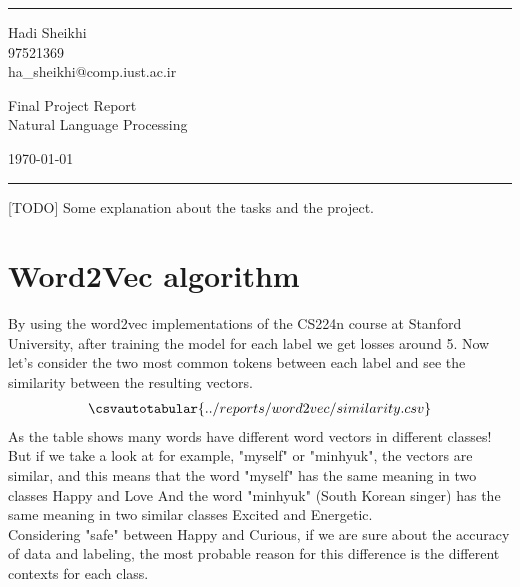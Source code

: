 \documentclass[a4paper]{article}
\begin{document}

\fancyhead[C]{}
\hrule \medskip %
\begin{minipage}{0.295\textwidth} 
\raggedright
\footnotesize
Hadi Sheikhi \hfill\\   
97521369\hfill\\
ha\_sheikhi@comp.iust.ac.ir
\end{minipage}
\begin{minipage}{0.4\textwidth} 
\centering 
\large 
Final Project Report\\ 
\normalsize 
Natural Language Processing\\ 
\end{minipage}
\begin{minipage}{0.295\textwidth} 
\raggedleft
\today\hfill\\
\end{minipage}
\medskip\hrule 
\bigskip



[TODO] Some explanation about the tasks and the project.
\section{Word2Vec algorithm}
By using the word2vec implementations of the CS224n course at Stanford University, after training the model for each label we get losses around 5. Now let's consider the two most common tokens between each label and see the similarity between the resulting vectors.\\
\begin{align*}
	\csvautotabular{../reports/word2vec/similarity.csv}
\end{align*} 
As the table shows many words have different word vectors in different classes! But if we take a look at for example, "myself" or "minhyuk", the vectors are similar, and this means that the word "myself" has the same meaning in two classes Happy and Love And the word "minhyuk" (South Korean singer) has the same meaning in two similar classes Excited and Energetic. \\
Considering "safe" between Happy and Curious, if we are sure about the accuracy of data and labeling, the most probable reason for this difference is the different contexts for each class. 

\bigskip

\pagebreak
\end{document}
